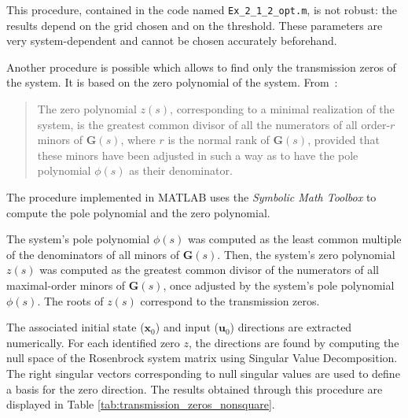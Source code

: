 \documentclass{scrreprt}
\begin{document}
This procedure, contained in the code named \texttt{Ex\_2\_1\_2\_opt.m}, is not robust: the results depend on the grid chosen and on the threshold. These parameters are very system-dependent and cannot be chosen accurately beforehand.

Another procedure is possible which allows to find only the transmission zeros of the system. It is based on the zero polynomial of the system. From~\cite{Sko05}:

\begin{quote}
    The zero polynomial $z(s)$, corresponding to a minimal realization of the system, is the greatest common divisor of all the numerators of all order-$r$ minors of $\boldsymbol{G}(s)$, where $r$ is the normal rank of $\boldsymbol{G}(s)$, provided that these minors have been adjusted in such a way as to have the pole polynomial $\phi(s)$ as their denominator.
\end{quote}

The procedure implemented in MATLAB uses the \textit{Symbolic Math Toolbox} to compute the pole polynomial and the zero polynomial.

The system's pole polynomial $\phi(s)$ was computed as the least common multiple of the denominators of all minors of $\boldsymbol{G}(s)$.
Then, the system's zero polynomial $z(s)$ was computed as the greatest common divisor of the numerators of all maximal-order minors of $\boldsymbol{G}(s)$, once adjusted by the system's pole polynomial $\phi(s)$. The roots of $z(s)$ correspond to the transmission zeros.

The associated initial state ($\boldsymbol{x}_0$) and input ($\boldsymbol{u}_0$) directions are extracted numerically. For each identified zero $z$, the directions are found by computing the null space of the Rosenbrock system matrix using Singular Value Decomposition.
The right singular vectors corresponding to null singular values are used to define a basis for the zero direction. The results obtained through this procedure are displayed in Table \ref{tab:transmission_zeros_nonsquare}.
\end{document}
